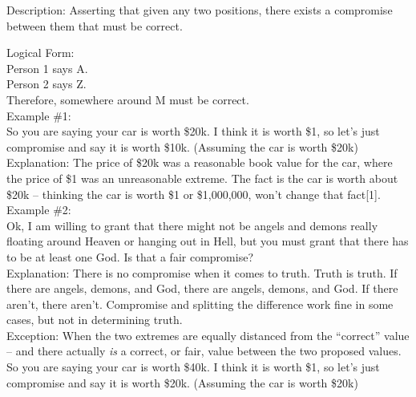 \documentclass[a4paper,12pt,single,pdftex]{scrbook}
\begin{document}
  
    Description: Asserting that given any two positions, there exists a compromise between them that must be correct.

    
      Logical Form:
    \\

    
      Person 1 says A.
    \\

    
      Person 2 says Z.
    \\

    
      Therefore, somewhere around M must be correct.
    \\

    
      Example \#1:
    \\

    
      So you are saying your car is worth \$20k.  I think it is worth \$1, so let’s just compromise and say it is worth \$10k. (Assuming the car is worth \$20k)
    \\

    
      Explanation: The price of \$20k was a reasonable book value for the car, where the price of \$1 was an unreasonable extreme.  The fact is the car is worth about \$20k -- thinking the car is worth \$1 or \$1,000,000, won’t change that fact[1].
    \\

    
      Example \#2:
    \\

    
      Ok, I am willing to grant that there might not be angels and demons really floating around Heaven or hanging out in Hell, but you must grant that there has to be at least one God.  Is that a fair compromise?
    \\

    
      Explanation: There is no compromise when it comes to truth.  Truth is truth.  If there are angels, demons, and God, there are angels, demons, and God.  If there aren’t, there aren’t.  Compromise and splitting the difference work fine in some cases, but not in determining truth.
    \\

    
      Exception: When the two extremes are equally distanced from the “correct” value -- and there actually {\it is} a correct, or fair, value between the two proposed values.
    \\

    
      So you are saying your car is worth \$40k.  I think it is worth \$1, so let’s just compromise and say it is worth \$20k. (Assuming the car is worth \$20k)
    \\
\end{document}
